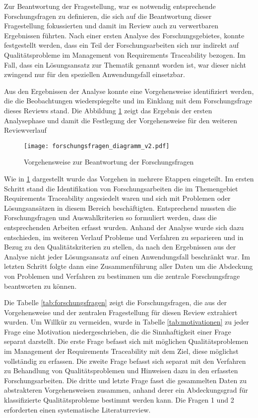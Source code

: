 Zur Beantwortung der Fragestellung, war es notwendig entsprechende Forschungsfragen zu definieren, die sich auf die Beantwortung dieser Fragestellung fokussierten und damit im Review auch zu verwertbaren Ergebnissen führten. Nach einer ersten Analyse des Forschungsgebietes, konnte festgestellt werden, dass ein Teil der Forschungsarbeiten sich nur indirekt auf Qualitätsprobleme im Management von Requirements Traceability bezogen. Im Fall, dass ein Lösungsansatz zur Thematik genannt worden ist, war dieser nicht zwingend nur für den speziellen Anwendungsfall einsetzbar.

Aus den Ergebnissen der Analyse konnte eine Vorgehensweise identifiziert werden, die die Beobachtungen wiederspiegelte und im Einklang mit dem Forschungsfrage dieses Reviews stand. Die Abbildung \ref{fig:abb_forschungsfragen} zeigt das Ergebnis der ersten Analysephase und damit die Festlegung der Vorgehensweise für den weiteren Reviewverlauf

\begin{figure}[!htb]
  \centering
  \texttt{[image: forschungsfragen\_diagramm\_v2.pdf]}
  \caption{Vorgehensweise zur Beantwortung der Forschungsfragen}
  \label{fig:abb_forschungsfragen}
\end{figure}

Wie in \ref{fig:abb_forschungsfragen} dargestellt wurde das Vorgehen in mehrere Etappen eingeteilt. Im ersten Schritt stand die Identifikation von Forschungsarbeiten die im Themengebiet Requirements Traceability angesiedelt waren und sich mit Problemen oder Lösungsansätzen in diesem Bereich beschäftigten. Entsprechend mussten die Forschungsfragen und Auswahlkriterien so formuliert werden, dass die entsprechenden Arbeiten erfasst wurden. Anhand der Analyse wurde sich dazu entschieden, im weiteren Verlauf Probleme und Verfahren zu separieren und in Bezug zu den Qualitätskriterien zu stellen, da nach den Ergebnissen aus der Analyse nicht jeder Lösungsansatz auf einen Anwendungsfall beschränkt war. Im letzten Schritt folgte dann eine Zusammenführung aller Daten um die Abdeckung von Problemen und Verfahren zu bestimmen um die zentrale Forschungsfrage beantworten zu können.

Die Tabelle \ref{tab:forschungsfragen} zeigt die Forschungsfragen, die aus der Vorgehensweise und der zentralen Fragestellung für diesen Review extrahiert wurden. Um Willkür zu vermeiden, wurde in Tabelle \ref{tab:motivationen} zu jeder Frage eine Motivation niedergeschrieben, die die Sinnhaftigkeit einer Frage separat darstellt. Die erste Frage befasst sich mit möglichen Qualitätsproblemen im Management der Requirements Traceability mit dem Ziel, diese möglichst vollständig zu erfassen. Die zweite Frage befasst sich separat mit den Verfahren zu Behandlung von Qualitätsproblemen und Hinweisen dazu in den erfassten Forschungsarbeiten. Die dritte und letzte Frage fasst die gesammelten Daten zu abstrakteren Vorgehensweisen zusammen, anhand derer ein Abdeckungsgrad für klassifizierte Qualitätsprobleme bestimmt werden kann. Die Fragen 1 und 2 erforderten einen systematische Literaturreview.

